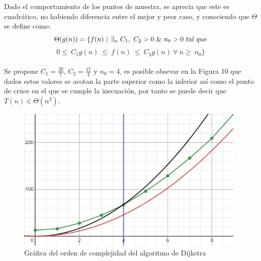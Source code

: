 \documentclass[12pt,twoside]{article}
\begin{document}
    Dado el comportamiento de los puntos de muestra, se aprecia que este es cuadr\'atico, no habiendo diferencia entre el mejor y peor caso, y conociendo que $\Theta$ se define como:
    $$\Theta(g(n)) = \{ f(n)~\arrowvert~\exists_{n}~C_{1},~C_{2}>0~\&~n_{0}>0~tal~que$$ $$0\leq~C_{1}g(n)~\leq~f(n)~\leq~C_{2}g(n)~\forall~n\geq~n_{0}\}$$
    \\
    Se propone $C_{1}=\frac{20}{7}$, $C_{2}=\frac{17}{4}$ y $n_{0}=4$, es posible obsevar en la Figura 10 que dados estos valores se acotan la parte superior como la inferior as\'i como el punto de cruce en el que se cumple la inecuaci\'on, por tanto se puede decir que $T(n)\in \Theta(n^{2})$.
    \begin{figure}[H]
        \centering
        \includegraphics[width=11cm]{imagenes/p1.png}
        \caption{Gr\'afica del orden de complejidad del algoritmo de Dijkstra}
    \end{figure}
\end{document}
